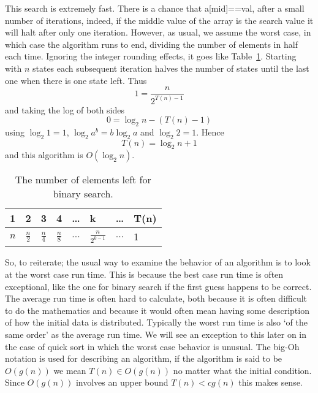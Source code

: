 \documentclass[11pt,a4paper]{scrartcl}
\begin{document}
This search is extremely fast. There is a chance that a[mid]==val,
after a small number of iterations, indeed, if the middle value of the
array is the search value it will halt after only one
iteration. However, as usual, we assume the worst case, in which case
the algorithm runs to end, dividing the number of elements in half
each time. Ignoring the integer rounding effects, it goes like
Table~\ref{tab_binary_search}. Starting with $n$ states each
subsequent iteration halves the number of states until the last one
when there is one state left. Thus
\begin{equation}
1=\frac{n}{2^{T(n)-1}}
\end{equation}
and taking the log of both sides
\begin{equation}
0=\log_2{n}-(T(n)-1)
\end{equation}
using $\log_2{1}=1$, $\log_2{a^b}=b\log_2{a}$ and $\log_2{2}=1$. Hence
\begin{equation}
T(n)=\log_2{n}+1
\end{equation}
and this algorithm is $O(\log_2{n})$.

\begin{table}
\begin{center}
\begin{tabular}{llllllll}
1&2&3&4&\ldots&k&\ldots&T(n)\\
\hline
$n$&$\frac{n}{2}$&$\frac{n}{4}$&$\frac{n}{8}$&$\ldots$&$\frac{n}{2^{k-1}}$&$\ldots$&1
\end{tabular}
\end{center}
\caption{The number of elements left for binary search.\label{tab_binary_search}}
\end{table}

So, to reiterate; the usual way to examine the behavior of an
algorithm is to look at the worst case run time. This is because the
best case run time is often exceptional, like the one for binary
search if the first guess happens to be correct. The average run time
is often hard to calculate, both because it is often difficult to do
the mathematics and because it would often mean having some
description of how the initial data is distributed. Typically the
worst run time is also \lq{}of the same order\rq{} as the average run
time. We will see an exception to this later on in the case of quick
sort in which the worst case behavior is unusual. The big-Oh notation
is used for describing an algorithm, if the algorithm is said to be
$O(g(n))$ we mean $T(n)\in O(g(n))$ no matter what the initial
condition. Since $O(g(n))$ involves an upper bound $T(n)<cg(n)$ this
makes sense.
\end{document}
